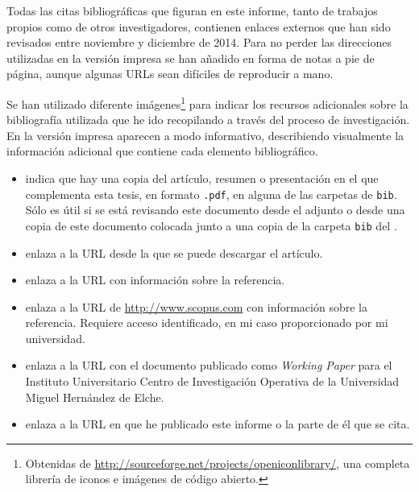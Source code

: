 \ABIERTO


Todas las citas bibliográficas que figuran en este informe, tanto de trabajos propios como de otros investigadores, contienen enlaces externos que han sido revisados entre noviembre y diciembre de 2014. Para no perder las direcciones utilizadas en la versión impresa se han añadido en forma de notas a pie de página, aunque algunas URLs sean difíciles de reproducir a mano.

Se han utilizado diferente imágenes\footnote{Obtenidas de \href{http://sourceforge.net/projects/openiconlibrary/}{http://sourceforge.net/projects/openiconlibrary/}, una completa librería de iconos e imágenes de código abierto.} para indicar los recursos adicionales sobre la bibliografía utilizada que he ido recopilando a través del proceso de investigación. En la versión impresa aparecen a modo informativo, describiendo visualmente la información adicional que contiene cada elemento bibliográfico.
 
\begin{itemize}
	\item[\iconoPDF] indica que hay una copia del artículo, resumen o presentación en el \dvdAdjunto que complementa esta tesis, en formato \texttt{.pdf}, en alguna de las carpetas de \texttt{bib}. Sólo es útil si se está revisando este documento desde el \dvdAdjunto adjunto o desde una copia de este documento colocada junto a una copia de la carpeta \texttt{bib} del \dvdAdjunto.
  \item[\iconoDescarga] enlaza a la URL desde la que se puede descargar el artículo.
  \item[\iconoWWW] enlaza a la URL con información sobre la referencia.
  \item[\iconoSCOPUS] enlaza a la URL de \url{http://www.scopus.com} con información sobre la referencia. Requiere acceso identificado, en mi caso proporcionado por mi universidad.
  \item[\logoCIO] enlaza a la URL con el documento publicado como \textsl{Working Paper} para el Instituto Universitario Centro de Investigación Operativa de la Universidad Miguel Hernández de Elche.
  \item[\logoGitHub] enlaza a la URL en que he publicado este informe o la parte de él que se cita.
\end{itemize}

